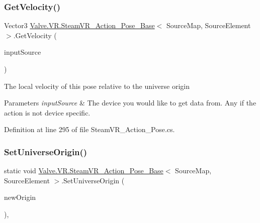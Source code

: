 \subsubsection{\texorpdfstring{GetVelocity()}{GetVelocity()}}
{\footnotesize\ttfamily Vector3 \mbox{\hyperlink{class_valve_1_1_v_r_1_1_steam_v_r___action___pose___base}{Valve.\+V\+R.\+Steam\+V\+R\+\_\+\+Action\+\_\+\+Pose\+\_\+\+Base}}$<$ Source\+Map, Source\+Element $>$.Get\+Velocity (\begin{DoxyParamCaption}\item[{\mbox{\hyperlink{namespace_valve_1_1_v_r_a82e5bf501cc3aa155444ee3f0662853f}{Steam\+V\+R\+\_\+\+Input\+\_\+\+Sources}}}]{input\+Source }\end{DoxyParamCaption})}



The local velocity of this pose relative to the universe origin 


\begin{DoxyParams}{Parameters}
{\em input\+Source} & The device you would like to get data from. Any if the action is not device specific.\\
\hline
\end{DoxyParams}


Definition at line 295 of file Steam\+V\+R\+\_\+\+Action\+\_\+\+Pose.\+cs.

\mbox{\label{class_valve_1_1_v_r_1_1_steam_v_r___action___pose___base_a6fed3c51e6941259760bcd88bd17c2dc}} 
\subsubsection{\texorpdfstring{SetUniverseOrigin()}{SetUniverseOrigin()}}
{\footnotesize\ttfamily static void \mbox{\hyperlink{class_valve_1_1_v_r_1_1_steam_v_r___action___pose___base}{Valve.\+V\+R.\+Steam\+V\+R\+\_\+\+Action\+\_\+\+Pose\+\_\+\+Base}}$<$ Source\+Map, Source\+Element $>$.Set\+Universe\+Origin (\begin{DoxyParamCaption}\item[{\mbox{\hyperlink{namespace_valve_1_1_v_r_a29be99a3c2f780157bd490db06a7f12f}{E\+Tracking\+Universe\+Origin}}}]{new\+Origin }\end{DoxyParamCaption})\hspace{0.3cm}{\ttfamily [static]}, {\ttfamily [protected]}}



